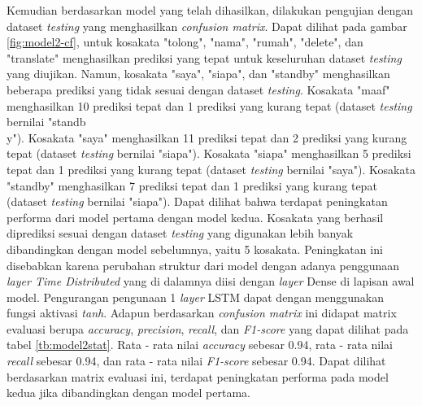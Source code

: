 Kemudian berdasarkan model yang telah dihasilkan, dilakukan pengujian dengan dataset \emph{testing} yang menghasilkan \emph{confusion matrix}. Dapat dilihat pada gambar \ref{fig:model2-cf}, untuk kosakata "tolong", "nama", "rumah", "delete", dan "translate" menghasilkan prediksi yang tepat untuk keseluruhan dataset \emph{testing} yang diujikan. Namun, kosakata "saya", "siapa", dan "standby" menghasilkan beberapa prediksi yang tidak sesuai dengan dataset \emph{testing}. Kosakata "maaf" menghasilkan 10 prediksi tepat dan 1 prediksi yang kurang tepat (dataset \emph{testing} bernilai "standb\\y"). Kosakata "saya" menghasilkan 11 prediksi tepat dan 2 prediksi yang kurang tepat (dataset \emph{testing} bernilai "siapa"). Kosakata "siapa" menghasilkan 5 prediksi tepat dan 1 prediksi yang kurang tepat (dataset \emph{testing} bernilai "saya"). Kosakata "standby" menghasilkan 7 prediksi tepat dan 1 prediksi yang kurang tepat (dataset \emph{testing} bernilai "siapa"). Dapat dilihat bahwa terdapat peningkatan performa dari model pertama dengan model kedua. Kosakata yang berhasil diprediksi sesuai dengan dataset \emph{testing} yang digunakan lebih banyak dibandingkan dengan model sebelumnya, yaitu 5 kosakata. Peningkatan ini disebabkan karena perubahan struktur dari model dengan adanya penggunaan \emph{layer Time Distributed} yang di dalamnya diisi dengan \emph{layer} Dense di lapisan awal model. Pengurangan pengunaan 1 \emph{layer} LSTM dapat dengan menggunakan fungsi aktivasi \emph{tanh}. Adapun berdasarkan \emph{confusion matrix} ini didapat matrix evaluasi berupa \emph{accuracy}, \emph{precision}, \emph{recall}, dan \emph{F1-score} yang dapat dilihat pada tabel \ref{tb:model2stat}. Rata - rata nilai \emph{accuracy} sebesar 0.94, rata - rata nilai \emph{recall} sebesar 0.94, dan rata - rata nilai \emph{F1-score} sebesar 0.94. Dapat dilihat berdasarkan matrix evaluasi ini, terdapat peningkatan performa pada model kedua jika dibandingkan dengan model pertama. 

